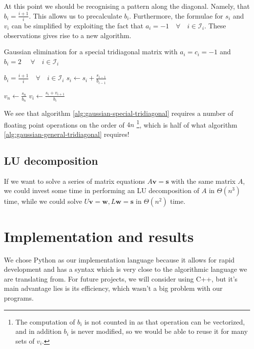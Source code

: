 \documentclass[a4paper]{article}
\begin{document}
At this point we should be recognising a pattern along the diagonal. Namely, that $b_i = \frac{i+1}{i}$. This allows us to precalculate $b_i$. Furthermore, the formulae for $s_i$ and $v_i$ can be simplified by exploiting the fact that $a_i = -1 \quad \forall \quad i \in \mathcal{I}_i$.
These observations gives rise to a new algorithm.

\begin{algorithm}
\caption{Gaussian elimination for a special tridiagonal matrix with $a_i = c_i = -1$ and $b_i = 2$ $\quad \forall \quad i \in \mathcal{I}_i$} \label{alg:gaussian-special-tridiagonal}
\begin{algorithmic}[1]
  \Require $b_i = \frac{i+1}{i} \quad \forall \quad i \in \mathcal{I}_i$
   
    \State $s_i \gets s_i + \frac{s_{i-1}}{b_{i-1}}$ 
  \EndFor

  \Statex {}
  \State $v_n \gets \frac{s_n}{b_n}$
    \State $v_i \gets \frac{s_i + v_{i+1}}{b_i}$
  \EndFor
\end{algorithmic}
\end{algorithm}

We see that algorithm \ref{alg:gaussian-special-tridiagonal} requires a number of floating point operations on the order of $4n$ \footnote{The computation of $b_i$ is not counted in as that operation can be vectorized, and in addition $b_i$ is never modified, so we would be able to reuse it for many sets of $v_i$.}, which is half of what algorithm \ref{alg:gaussian-general-tridiagonal} requires!

\subsection{LU decomposition}
If we want to solve a series of matrix equations $A\mathbf{v} = \mathbf{s}$ with the same matrix $A$, we could invest some time in performing an LU decomposition of $A$ in $\Theta(n^3)$ time, while we could solve $U\mathbf{v} = \mathbf{w}, L\mathbf{w} = \mathbf{s}$ in $\Theta(n^2)$ time.

\section{Implementation and results}\label{sec:implementation_and_results}
We chose Python as our implementation language because it allows for rapid development and has a syntax which is very close to the algorithmic language we are translating from. For future projects, we will consider using C++, but it's main advantage lies is its efficiency, which wasn't a big problem with our programs.
\end{document}
